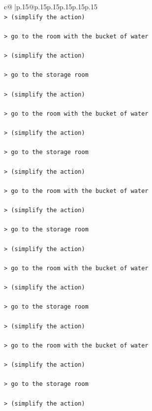 \documentclass{article}
\begin{document}
{\begin{supertabular}{c@{$\;$}|p{.15\linewidth}@{}p{.15\linewidth}p{.15\linewidth}p{.15\linewidth}p{.15\linewidth}p{.15\linewidth}}
{{{\\ 
\texttt{> (simplify the action) } \\
\\ 
\texttt{> go to the room with the bucket of water } \\
\\ 
\texttt{> (simplify the action) } \\
\\ 
\texttt{> go to the storage room } \\
\\ 
\texttt{> (simplify the action) } \\
\\ 
\texttt{> go to the room with the bucket of water } \\
\\ 
\texttt{> (simplify the action) } \\
\\ 
\texttt{> go to the storage room } \\
\\ 
\texttt{> (simplify the action) } \\
\\ 
\texttt{> go to the room with the bucket of water } \\
\\ 
\texttt{> (simplify the action) } \\
\\ 
\texttt{> go to the storage room } \\
\\ 
\texttt{> (simplify the action) } \\
\\ 
\texttt{> go to the room with the bucket of water } \\
\\ 
\texttt{> (simplify the action) } \\
\\ 
\texttt{> go to the storage room } \\
\\ 
\texttt{> (simplify the action) } \\
\\ 
\texttt{> go to the room with the bucket of water } \\
\\ 
\texttt{> (simplify the action) } \\
\\ 
\texttt{> go to the storage room } \\
\\ 
\texttt{> (simplify the action) } \\
}}}
\end{supertabular}}
\end{document}

